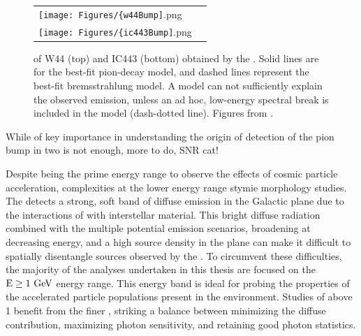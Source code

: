 \begin{figure}[h!]
	\begin{center}
		\begin{tabular}{ll}
			\texttt{[image: Figures/\{w44Bump]}.png} \\
			\texttt{[image: Figures/\{ic443Bump]}.png} \\
		\end{tabular}
	\end{center}
	\caption[\gam{} SEDs of SNRs W44 and IC443 obtained with the \lat{}]{\gam{} \seds{} of \snrs{} W44 (top) and IC443 (bottom) obtained by the \lat{}. Solid lines are for the best-fit pion-decay model, and dashed lines represent the best-fit bremsstrahlung model. A \brems{} model can not sufficiently explain the observed \gam{} emission, unless an ad hoc, low-energy spectral break is included in the \brems{} model (dash-dotted line). Figures from \cite{W44pion}.
		\label{fig:pionBump}
	}
\end{figure}
While of key importance in understanding the origin of \crs{} detection of the pion bump in two \snrs{} is not enough, more to do, SNR cat!

	







Despite being the prime energy range to observe the effects of cosmic particle acceleration, complexities at the lower \lat{} energy range stymie \snr{} morphology studies. The \lat{} detects a strong, soft band of diffuse emission in the Galactic plane due to the interactions of \crs{} with interstellar material. This bright diffuse radiation combined with the multiple potential emission scenarios, broadening \psf{} at decreasing energy, and a high source density in the plane can make it difficult to spatially disentangle sources observed by the \lat{}. To circumvent these 
difficulties, the majority of the analyses undertaken in this thesis are focused on the ${\rm E \geq 1~\mathrm{GeV}}$ energy range. This energy band is ideal for probing the properties of the accelerated particle populations present in the \snr{} environment. Studies of  \snrs{}  above 1\gev{} benefit from the finer \lat{} \psf{}, striking a balance between minimizing the diffuse contribution, maximizing photon sensitivity, and retaining good photon statistics.

